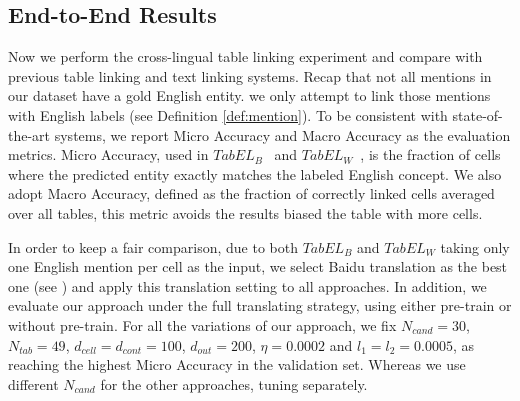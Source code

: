 \subsection{End-to-End Results}
\label{sec:exp-e2e-results}

Now we perform the cross-lingual table linking experiment and compare with
previous table linking and text linking systems.
Recap that not all mentions in our dataset have a gold English entity.
we only attempt to link those mentions with English labels (see Definition \ref{def:mention}).
To be consistent with state-of-the-art systems, we report Micro Accuracy
and Macro Accuracy as the evaluation metrics.
Micro Accuracy, used in $TabEL_B$~\cite{bhagavatula2015tabel} and
$TabEL_W$~\cite{wu2016entity}, is the fraction of cells
where the predicted entity exactly matches the labeled English concept.
We also adopt Macro Accuracy, defined as the fraction of
correctly linked cells averaged over all tables, this metric
avoids the results biased the table with more cells.


In order to keep a fair comparison,
due to both $TabEL_B$ and $TabEL_W$ taking only one English mention per cell as the input,
we select Baidu translation as the best one (see )
and apply this translation setting to all approaches.
In addition, we evaluate our approach under the full translating strategy,
using either pre-train or without pre-train.
For all the variations of our approach,
we fix $N_{cand}=30$, $N_{tab}=49$, $d_{cell}=d_{cont}=100$, $d_{out}=200$, $\eta=0.0002$ and $l_1=l_2=0.0005$, 
as reaching the highest Micro Accuracy in the validation set.
Whereas we use different $N_{cand}$ for the other approaches, tuning separately.

